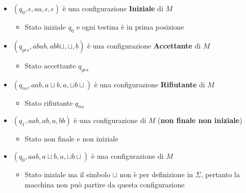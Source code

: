 \begin{itemize}
    \item $(q_0, \epsilon, aa, \epsilon, \epsilon)$ è una configurazione \textbf{Iniziale} di $M$
    \begin{itemize}
        \item Stato iniziale $q_0$ e ogni testina è in prima posizione
    \end{itemize}
    \item $(q_{yes}, abab, abb \sqcup, \sqcup, b)$ è una configurazione \textbf{Accettante} di $M$
    \begin{itemize}
        \item Stato accettante $q_{yes}$
    \end{itemize}
    \item $(q_{no}, aab, a \sqcup b, a, \sqcup b \sqcup)$ è una configurazione \textbf{Rifiutante} di $M$
    \begin{itemize}
        \item Stato rifiutante $q_{no}$
    \end{itemize}
    \item $(q_1, aab, ab, a, bb)$ è una configurazione di $M$ (\textbf{non finale non iniziale})
    \begin{itemize}
        \item Stato non finale e non iniziale
    \end{itemize}
    \item $(q_0, aab, a \sqcup b, a, \sqcup b \sqcup)$ è una configurazione di $M$
    \begin{itemize}
        \item Stato iniziale ma il simbolo $\sqcup$ non è per definizione in $\Sigma$, pertanto la macchina non può partire da questa configurazione
    \end{itemize}
\end{itemize}



